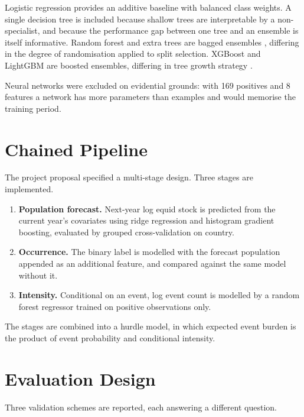 \documentclass[10pt,openany]{report}
\begin{document}
Logistic regression provides an additive baseline with balanced class weights. A single decision
tree is included because shallow trees are interpretable by a non-specialist, and because the
performance gap between one tree and an ensemble is itself informative. Random forest and extra
trees are bagged ensembles \cite{breiman2001}, differing in the degree of randomisation applied to
split selection.
XGBoost and LightGBM are boosted ensembles, differing in tree growth strategy \cite{chen2016,ke2017}.

Neural networks were excluded on evidential grounds: with 169 positives and 8
features a network has more parameters than examples and would memorise the training period.

\section{Chained Pipeline}

The project proposal specified a multi-stage design. Three stages are implemented.

\begin{enumerate}
  \item \textbf{Population forecast.} Next-year log equid stock is predicted from the current
        year's covariates using ridge regression and histogram gradient boosting, evaluated by
        grouped cross-validation on country.
  \item \textbf{Occurrence.} The binary label is modelled with the forecast population appended as
        an additional feature, and compared against the same model without it.
  \item \textbf{Intensity.} Conditional on an event, log event count is modelled by a random forest
        regressor trained on positive observations only.
\end{enumerate}

The stages are combined into a hurdle model, in which expected event burden is the product of
event probability and conditional intensity.

\section{Evaluation Design}

Three validation schemes are reported, each answering a different question.
\end{document}
